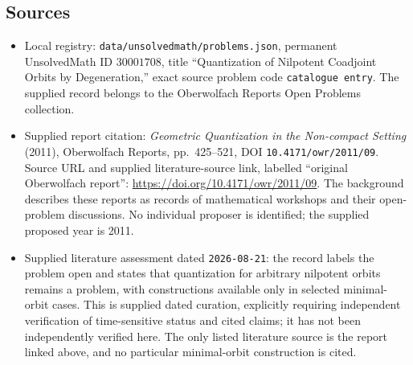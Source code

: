 \documentclass[11pt]{article}
\begin{document}
\subsection{Sources}
\begin{itemize}
\item Local registry: \texttt{data/unsolvedmath/problems.json}, permanent UnsolvedMath ID \(30001708\), title ``Quantization of Nilpotent Coadjoint Orbits by Degeneration,'' exact source problem code \texttt{catalogue entry}. The supplied record belongs to the Oberwolfach Reports Open Problems collection.
\item Supplied report citation: \emph{Geometric Quantization in the Non-compact Setting} (2011), Oberwolfach Reports, pp.\ 425--521, DOI \texttt{10.4171/owr/2011/09}. Source URL and supplied literature-source link, labelled ``original Oberwolfach report'': \url{https://doi.org/10.4171/owr/2011/09}. The background describes these reports as records of mathematical workshops and their open-problem discussions. No individual proposer is identified; the supplied proposed year is 2011.
\item Supplied literature assessment dated \texttt{2026-08-21}: the record labels the problem open and states that quantization for arbitrary nilpotent orbits remains a problem, with constructions available only in selected minimal-orbit cases. This is supplied dated curation, explicitly requiring independent verification of time-sensitive status and cited claims; it has not been independently verified here. The only listed literature source is the report linked above, and no particular minimal-orbit construction is cited.
\end{itemize}
\end{document}
